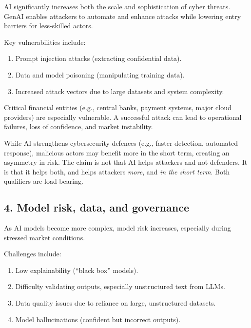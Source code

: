 AI significantly increases both the scale and sophistication of cyber threats. GenAI enables
attackers to automate and enhance attacks while lowering entry barriers for less-skilled
actors.

Key vulnerabilities include:

\begin{enumerate}[label=\textbf{\alph*)}]
\item Prompt injection attacks (extracting confidential data).
\item Data and model poisoning (manipulating training data).
\item Increased attack vectors due to large datasets and system complexity.
\end{enumerate}

Critical financial entities (e.g., central banks, payment systems, major cloud providers) are
especially vulnerable. A successful attack can lead to operational failures, loss of
confidence, and market instability.

\begin{citrapbox}[title={An asymmetry, stated in the notes and worth holding exactly as written}]
While AI strengthens cybersecurity defences (e.g., faster detection, automated response),
malicious actors may benefit more in the short term, creating an asymmetry in risk. The claim
is not that AI helps attackers and not defenders. It is that it helps both, and helps
attackers \emph{more}, and \emph{in the short term}. Both qualifiers are load-bearing.
\end{citrapbox}

\subsection*{4. Model risk, data, and governance}

As AI models become more complex, model risk increases, especially during stressed market
conditions.

Challenges include:

\begin{enumerate}[label=\textbf{\alph*)}]
\item Low explainability (``black box'' models).
\item Difficulty validating outputs, especially unstructured text from LLMs.
\item Data quality issues due to reliance on large, unstructured datasets.
\item Model hallucinations (confident but incorrect outputs).
\end{enumerate}


